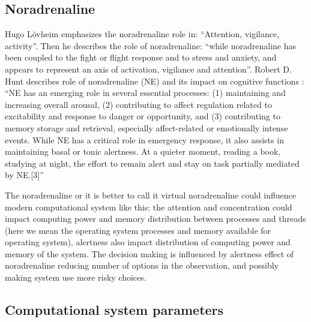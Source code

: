 \subsection{Noradrenaline}

Hugo L\"{o}vheim \cite{cubeofemotions} emphasizes the noradrenaline role in: ``Attention, vigilance, activity''. Then he describes the role of noradrenaline: ``while noradrenaline has been coupled to the fight or flight response and to stress and anxiety, and appears to represent an axis of activation, vigilance and attention''. Robert D. Hunt describes role of noradrenaline (NE) and its impact on cognitive functions \cite{norepinephrine} : ``NE has an emerging role in several essential processes: (1) maintaining and increasing overall arousal, (2) contributing to affect regulation related to excitability and response to danger or opportunity, and (3) contributing to memory storage and retrieval, especially affect-related or emotionally intense events. While NE has a critical role in emergency response, it also assists in maintaining basal or tonic alertness. At a quieter moment, reading a book, studying at night, the effort to remain alert and stay on task partially mediated by NE.[3]''

The noradrenaline or it is better to call it virtual noradrenaline could influence modern computational system like this: the attention and concentration could impact computing power and memory distribution between processes and threads (here we mean the operating system processes and memory available for operating system), alertness also impact distribution of computing power and memory of the system. The decision making is influenced by alertness effect of noradrenaline reducing number of options in the observation, and possibly making system use more risky choices. 

\subsection{Computational system parameters}

